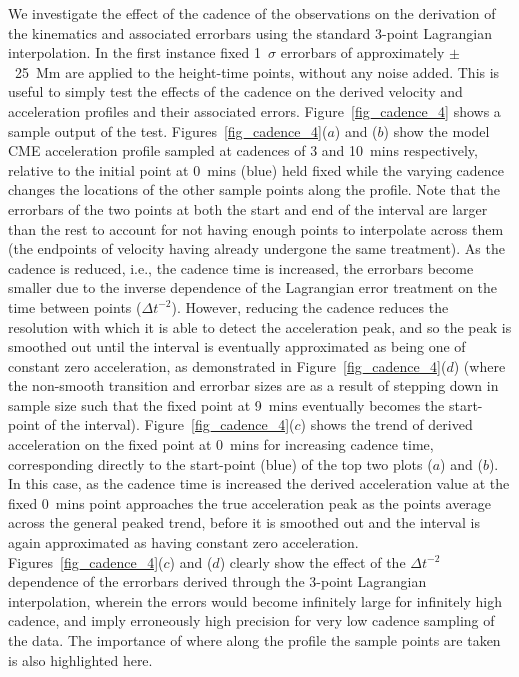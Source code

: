 \documentclass[structabstract]{aa}
\begin{document}
We investigate the effect of the cadence of the observations on the derivation of the kinematics and associated errorbars using the standard 3-point Lagrangian interpolation. In the first instance fixed 1~$\sigma$ errorbars of approximately $\pm$~25~Mm are applied to the height-time points, without any noise added. This is useful to simply test the effects of the cadence on the derived velocity and acceleration profiles and their associated errors. Figure~\ref{fig_cadence_4} shows a sample output of the test. Figures~\ref{fig_cadence_4}($a$) and ($b$) show the model CME acceleration profile sampled at cadences of 3 and 10~mins respectively, relative to the initial point at 0~mins (blue) held fixed while the varying cadence changes the locations of the other sample points along the profile. Note that the errorbars of the two points at both the start and end of the interval are larger than the rest to account for not having enough points to interpolate across them (the endpoints of velocity having already undergone the same treatment). As the cadence is reduced, i.e., the cadence time is increased, the errorbars become smaller due to the inverse dependence of the Lagrangian error treatment on the time between points ($\Delta t^{-2}$). However, reducing the cadence reduces the resolution with which it is able to detect the acceleration peak, and so the peak is smoothed out until the interval is eventually approximated as being one of constant zero acceleration, as demonstrated in Figure~\ref{fig_cadence_4}($d$) (where the non-smooth transition and errorbar sizes are as a result of stepping down in sample size such that the fixed point at 9~mins eventually becomes the start-point of the interval). Figure~\ref{fig_cadence_4}($c$) shows the trend of derived acceleration on the fixed point at 0~mins for increasing cadence time, corresponding directly to the start-point (blue) of the top two plots ($a$) and ($b$). In this case, as the cadence time is increased the derived acceleration value at the fixed 0~mins point approaches the true acceleration peak as the points average across the general peaked trend, before it is smoothed out and the interval is again approximated as having constant zero acceleration. Figures~\ref{fig_cadence_4}($c$) and ($d$) clearly show the effect of the $\Delta t^{-2}$ dependence of the errorbars derived through the 3-point Lagrangian interpolation, wherein the errors would become infinitely large for infinitely high cadence, and imply erroneously high precision for very low cadence sampling of the data. The importance of where along the profile the sample points are taken is also highlighted here.
\end{document}
